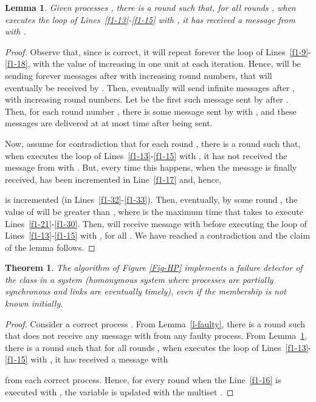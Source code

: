 \documentclass[10pt, conference, compsocconf]{IEEEtran}
\newtheorem{theorem}{Theorem}
\newtheorem{lemma}{Lemma}
\begin{document}
\begin{lemma}
\label{l-correct}
Given processes , there is a round  such that, for all 
rounds , 
when  executes the loop of Lines~\ref{f1-13}-\ref{f1-15} 
with , it has received 
a message 
 from  with 
.
\end{lemma}
\begin{proof}
Observe that, since  is correct, it will repeat forever the loop of 
Lines~\ref{f1-9}-\ref{f1-18}, with the value of  
increasing in one unit at each iteration.
Hence,  will be sending forever messages  
after  with increasing round numbers, that will eventually
 be received by . Then,  eventually will send infinite 
 messages after , 
with increasing round numbers. 
Let  be the first such 
message sent by  after . Then, for each round number , 
there is some message  
sent by  with , and these messages are delivered at
  at most  time after being sent. 


Now, assume for contradiction that for each round , 
there is a round  such that, when  executes the loop 
of Lines~\ref{f1-13}-\ref{f1-15} with , 
it has not received the message 
 from  with 
. But, every time this happens, when the message 
is finally received,
 has been incremented in Line~\ref{f1-17} and, hence, 
 
is incremented (in Lines~\ref{f1-32}-\ref{f1-33}). 
Then, eventually, by some round , 
the value of  will be greater than , 
where  is the maximum time that  takes 
to execute Lines~\ref{f1-21}-\ref{f1-30}. 
Then,  will receive 
message  
with  before executing the loop of 
Lines~\ref{f1-13}-\ref{f1-15} 
with , for all . We have reached a contradiction 
and the claim of the lemma follows.
\end{proof}

\begin{theorem}
The algorithm of Figure \ref{Fig-HP} implements a failure detector of 
the class  in a system  (homonymous 
system where processes are partially synchronous and links are eventually 
timely), even if the membership is not known initially.
\end{theorem}
\begin{proof}
Consider a correct process . From Lemma~\ref{l-faulty}, there is a 
round  such that  does not receive any 
 message with
  from any faulty process. From Lemma~\ref{l-correct}, 
there is a round  such that for all rounds , when 
 executes the loop of Lines~\ref{f1-13}-\ref{f1-15} 
with , it has 
received a  message with 

from each correct process. Hence, for every round  
when the Line~\ref{f1-16} is executed with , 
the variable  
is updated with the multiset .
\end{proof}
\end{document}
